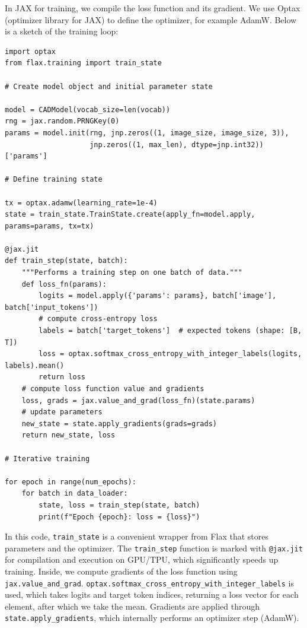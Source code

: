 \documentclass{article}
\begin{document}
In JAX for training, we compile the loss function and its gradient. We use Optax (optimizer library for JAX) to define the optimizer, for example AdamW. Below is a sketch of the training loop:

\begin{lstlisting}
import optax
from flax.training import train_state

# Create model object and initial parameter state

model = CADModel(vocab_size=len(vocab))
rng = jax.random.PRNGKey(0)
params = model.init(rng, jnp.zeros((1, image_size, image_size, 3)),
                    jnp.zeros((1, max_len), dtype=jnp.int32))['params']

# Define training state

tx = optax.adamw(learning_rate=1e-4)
state = train_state.TrainState.create(apply_fn=model.apply, params=params, tx=tx)

@jax.jit
def train_step(state, batch):
    """Performs a training step on one batch of data."""
    def loss_fn(params):
        logits = model.apply({'params': params}, batch['image'], batch['input_tokens'])
        # compute cross-entropy loss
        labels = batch['target_tokens']  # expected tokens (shape: [B, T])
        loss = optax.softmax_cross_entropy_with_integer_labels(logits, labels).mean()
        return loss
    # compute loss function value and gradients
    loss, grads = jax.value_and_grad(loss_fn)(state.params)
    # update parameters
    new_state = state.apply_gradients(grads=grads)
    return new_state, loss

# Iterative training

for epoch in range(num_epochs):
    for batch in data_loader:
        state, loss = train_step(state, batch)
        print(f"Epoch {epoch}: loss = {loss}")
\end{lstlisting}

In this code, \texttt{train_state} is a convenient wrapper from Flax that stores parameters and the optimizer. The \texttt{train_step} function is marked with \texttt{@jax.jit} for compilation and execution on GPU/TPU, which significantly speeds up training. Inside, we compute gradients of the loss function using \texttt{jax.value_and_grad}. \texttt{optax.softmax_cross_entropy_with_integer_labels} is used, which takes logits and target token indices, returning a loss vector for each element, after which we take the mean. Gradients are applied through \texttt{state.apply_gradients}, which internally performs an optimizer step (AdamW).
\end{document}
